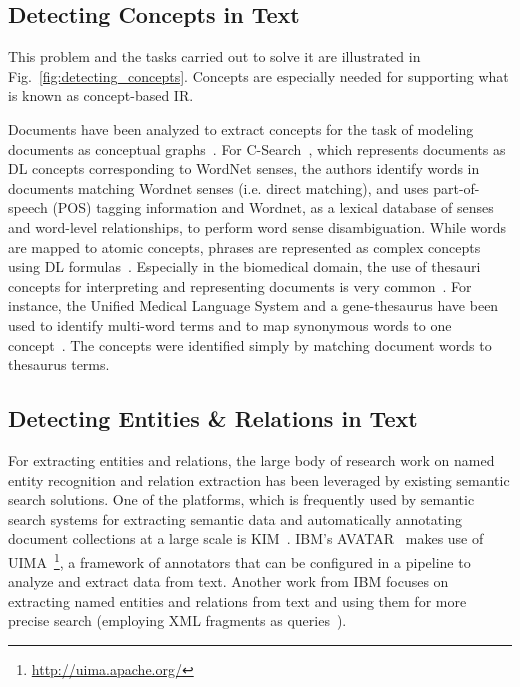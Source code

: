 \subsection{Detecting Concepts in Text} This problem and the tasks carried out to solve it are illustrated in Fig.~\ref{fig:detecting_concepts}. Concepts are especially needed for supporting what is known as concept-based IR. 

Documents have been analyzed to extract concepts for the task of modeling documents as conceptual graphs~\cite{DBLP:conf/ecai/CorbyDF04}. For C-Search~\cite{DBLP:conf/esws/GiunchigliaKZ09}, which represents documents as DL concepts corresponding to WordNet senses, the authors identify words in documents matching Wordnet senses (i.e. direct matching), and uses part-of-speech (POS) tagging information and Wordnet, as a lexical database of senses and word-level relationships, to perform word sense disambiguation. While words are mapped to atomic concepts, phrases are represented as complex concepts using DL formulas~\cite{DBLP:conf/esws/GiunchigliaKZ09}. Especially in the biomedical domain, the use of thesauri concepts for interpreting and representing documents is very common~\cite{DBLP:conf/trec/TrieschniggKS06,DBLP:conf/trec/ZhouYTS06}. For instance, the Unified Medical Language System and a gene-thesaurus have been used to identify multi-word terms and to map synonymous words to one concept~\cite{DBLP:conf/trec/TrieschniggKS06}. The concepts were identified simply by matching document words to thesaurus terms.
	
	
\subsection{Detecting Entities \& Relations in Text} For extracting entities and relations, the large body of research work on named entity recognition and relation extraction has been leveraged by existing semantic search solutions. One of the platforms, which is frequently used by semantic search systems for extracting semantic data and
automatically annotating document collections at a large scale is KIM~\cite{DBLP:journals/ws/KiryakovPTMO04}. IBM's AVATAR~\cite{DBLP:conf/sigmod/KandoganKRVZ06} makes use of UIMA~\footnote{\url{http://uima.apache.org/}}, a framework of annotators that can be configured in a pipeline to analyze and extract data from text. Another work from IBM focuses on extracting named entities and relations from text and using them for more precise search (employing XML fragments as queries~\cite{DBLP:conf/sigir/Chu-CarrollPCFD06,DBLP:conf/cikm/Chu-CarrollP07}).

